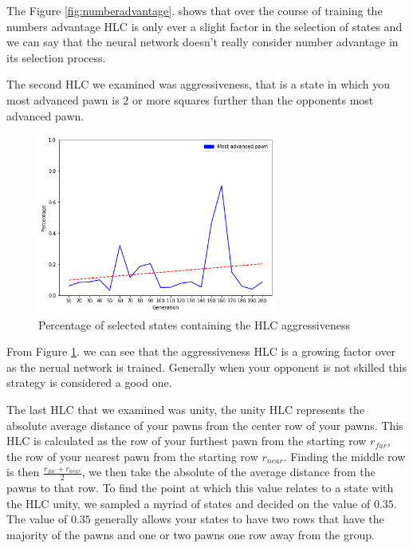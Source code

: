 The Figure \ref{fig:numberadvantage}. shows that over the course of training the numbers advantage HLC is only ever a slight factor in the selection of states and we can say that the neural network doesn't really consider number advantage in its selection process.

The second HLC we examined was aggressiveness, that is a state in which you most advanced pawn is $2$ or more squares further than the opponents most advanced pawn. 

\begin{figure}[]
    \centering
    \includegraphics[width=0.7\textwidth]{graphics/most_advanced_trend.png}
    \caption{Percentage of selected states containing the HLC aggressiveness}
    \label{fig:aggressiveness}
\end{figure}

From Figure \ref{fig:aggressiveness}. we can see that the aggressiveness HLC is a growing factor over as the nerual network is trained. Generally when your opponent is not skilled this strategy is considered a good one.

The last HLC that we examined was unity, the unity HLC represents the absolute average distance of your pawns from the center row of your pawns. This HLC is calculated as the row of your furthest pawn from the starting row $r_{far}$, the row of your nearest pawn from the starting row $r_{near}$. Finding the middle row is then $\frac{r_{far} + r_{near}}{2}$, we then take the absolute of the average distance from the pawns to that row. To find the point at which this value relates to a state with the HLC unity, we sampled a myriad of states and decided on the value of $0.35$. The value of $0.35$ generally allows your states to have two rows that have the majority of the pawns and one or two pawns one row away from the group.

